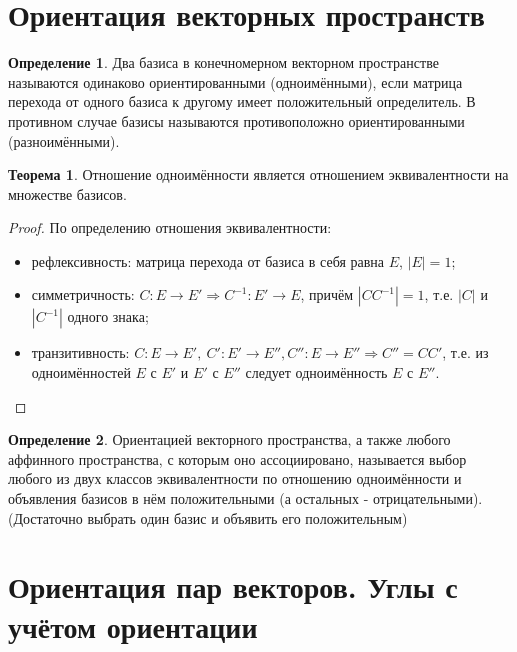 \documentclass[a4paper, 12pt]{article}
\theoremstyle{definition}
\newtheorem*{definition}{Определение}
\newtheorem*{theorem}{Теорема}
\begin{document}
	\section{Ориентация векторных пространств}
	\begin{definition}
		Два базиса в конечномерном векторном пространстве называются одинаково ориентированными (одноимёнными), если матрица перехода от одного базиса к другому имеет положительный определитель. В противном случае базисы называются противоположно ориентированными (разноимёнными).
	\end{definition}
	\begin{theorem}
		Отношение одноимённости является отношением эквивалентности на множестве базисов.
	\end{theorem}
	\begin{proof}
		По определению отношения эквивалентности:
		\begin{itemize}
			\item рефлексивность: матрица перехода от базиса в себя равна $E$, $|E| = 1$;
			\item симметричность: $C: E \rightarrow E' \Rightarrow C^{-1}: E' \rightarrow E$, причём $|C C^{-1}| = 1$, т.е. $|C|$ и $|C^{-1}|$ одного знака;
			\item транзитивность: $C: E \rightarrow E', \ C': E' \rightarrow E'', C'': E \rightarrow E'' \Rightarrow C'' = CC'$, т.е. из одноимённостей $E$ с $E'$ и $E'$ с $E''$ следует одноимённость $E$ с $E''$.
		\end{itemize}
	\end{proof}
	\begin{definition}
		Ориентацией векторного пространства, а также любого аффинного пространства, с которым оно ассоциировано, называется выбор любого из двух классов эквивалентности по отношению одноимённости и объявления базисов в нём положительными (а остальных - отрицательными).\\ 
		(Достаточно выбрать один базис и объявить его положительным)
	\end{definition}
	\section{Ориентация пар векторов. Углы с учётом ориентации}
\end{document}
